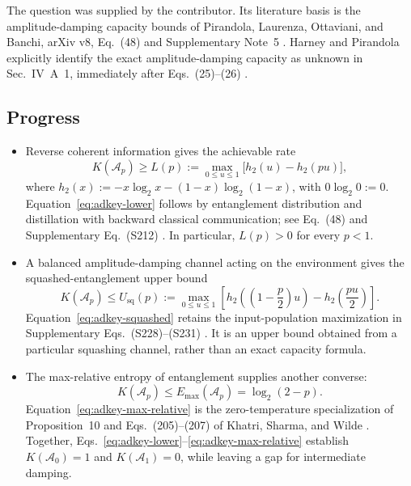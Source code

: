 The question was supplied by the contributor. Its literature basis is the amplitude-damping capacity bounds of Pirandola, Laurenza, Ottaviani, and Banchi, arXiv v8, Eq.~(48) and Supplementary Note~5 . Harney and Pirandola explicitly identify the exact amplitude-damping capacity as unknown in Sec.~IV~A~1, immediately after Eqs.~(25)--(26) .

\subsection*{Progress}

\begin{itemize}
  \item Reverse coherent information gives the achievable rate
\begin{equation}
  K(\mathcal A_p)\ge L(p):=\max_{0\le u\le1}\bigl[h_2(u)-h_2(pu)\bigr],
  \label{eq:adkey-lower}
\end{equation}
where $h_2(x):=-x\log_2x-(1-x)\log_2(1-x)$, with $0\log_2 0:=0$. Equation~\eqref{eq:adkey-lower} follows by entanglement distribution and distillation with backward classical communication; see Eq.~(48) and Supplementary Eq.~(S212) . In particular, $L(p)>0$ for every $p<1$.

  \item A balanced amplitude-damping channel acting on the environment gives the squashed-entanglement upper bound
\begin{equation}
  K(\mathcal A_p)\le U_{\mathrm{sq}}(p):=\max_{0\le u\le1}\left[h_2\!\left(\left(1-\frac p2\right)u\right)-h_2\!\left(\frac{pu}{2}\right)\right].
  \label{eq:adkey-squashed}
\end{equation}
Equation~\eqref{eq:adkey-squashed} retains the input-population maximization in Supplementary Eqs.~(S228)--(S231) . It is an upper bound obtained from a particular squashing channel, rather than an exact capacity formula.

  \item The max-relative entropy of entanglement supplies another converse:
\begin{equation}
  K(\mathcal A_p)\le E_{\max}(\mathcal A_p)=\log_2(2-p).
  \label{eq:adkey-max-relative}
\end{equation}
Equation~\eqref{eq:adkey-max-relative} is the zero-temperature specialization of Proposition~10 and Eqs.~(205)--(207) of Khatri, Sharma, and Wilde . Together, Eqs.~\eqref{eq:adkey-lower}--\eqref{eq:adkey-max-relative} establish $K(\mathcal A_0)=1$ and $K(\mathcal A_1)=0$, while leaving a gap for intermediate damping.
\end{itemize}

